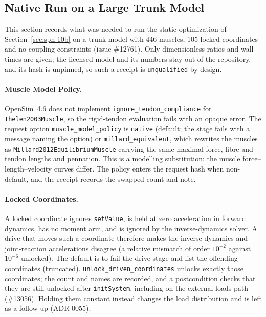 \subsection{Native Run on a Large Trunk Model}
\label{sec:spn-10b-bruno}

This section records what was needed to run the static optimization of
Section~\ref{sec:spn-10b} on a trunk model with 446 muscles, 105 locked
coordinates and no coupling constraints (issue \#12761). Only dimensionless
ratios and wall times are given; the licensed model and its numbers stay out
of the repository, and its hash is unpinned, so such a receipt is
\texttt{unqualified} by design.

\paragraph{Muscle Model Policy.}
OpenSim~4.6 does not implement \texttt{ignore\_tendon\_compliance} for
\texttt{Thelen2003Muscle}, so the rigid-tendon evaluation fails with an opaque
error. The request option \texttt{muscle\_model\_policy} is \texttt{native}
(default; the stage fails with a message naming the option) or
\texttt{millard\_equivalent}, which rewrites the muscles as
\texttt{Millard2012EquilibriumMuscle} carrying the same maximal force, fibre
and tendon lengths and pennation. This is a modelling substitution: the
muscle force--length--velocity curves differ. The policy enters the request
hash when non-default, and the receipt records the swapped count and note.

\paragraph{Locked Coordinates.}
A locked coordinate ignores \texttt{setValue}, is held at zero acceleration in
forward dynamics, has no moment arm, and is ignored by the inverse-dynamics
solver. A drive that moves such a coordinate therefore makes the
inverse-dynamics and joint-reaction accelerations disagree (a relative
mismatch of order $10^{-2}$ against $10^{-6}$ unlocked). The default is to
fail the drive stage and list the offending coordinates (truncated).
\texttt{unlock\_driven\_coordinates} unlocks exactly those coordinates; the
count and names are recorded, and a postcondition checks that they are still
unlocked after \texttt{initSystem}, including on the external-loads path
(\#13056). Holding them constant instead changes the load
distribution and is left as a follow-up (ADR-0055).

